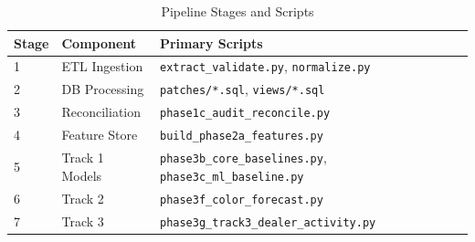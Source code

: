 \begin{table}[hbt!]
\centering
\caption{Pipeline Stages and Scripts}
\label{tab:pipeline_stages}
\begin{tabular}{@{} l l l @{}}
\toprule
\textbf{Stage} & \textbf{Component} & \textbf{Primary Scripts} \\
\midrule
1 & ETL Ingestion & \texttt{extract\_validate.py}, \texttt{normalize.py} \\
2 & DB Processing & \texttt{patches/*.sql}, \texttt{views/*.sql} \\
3 & Reconciliation & \texttt{phase1c\_audit\_reconcile.py} \\
4 & Feature Store & \texttt{build\_phase2a\_features.py} \\
5 & Track 1 Models & \texttt{phase3b\_core\_baselines.py}, \texttt{phase3c\_ml\_baseline.py} \\
6 & Track 2 & \texttt{phase3f\_color\_forecast.py} \\
7 & Track 3 & \texttt{phase3g\_track3\_dealer\_activity.py} \\
\bottomrule
\end{tabular}
\end{table}
